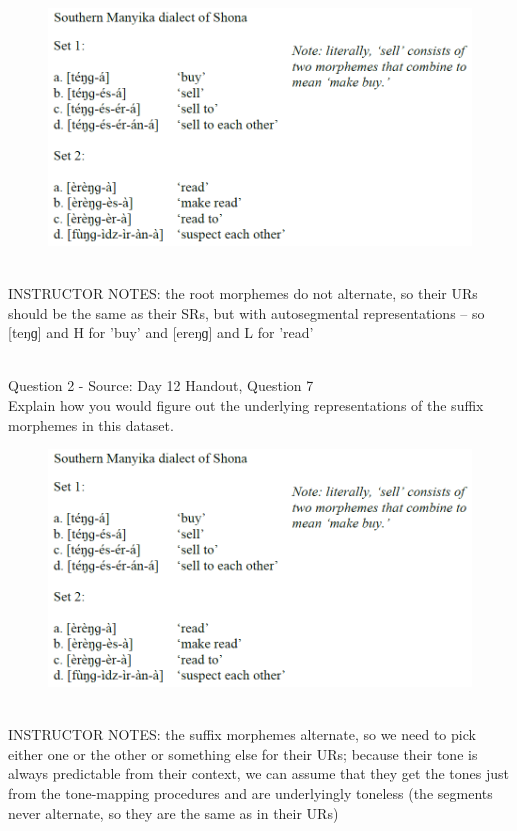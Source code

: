 \documentclass[12pt]{article}
\begin{document}
\begin{figure}[H]
\includegraphics{../images/shona.png}
\end{figure}

~\\
INSTRUCTOR NOTES: the root morphemes do not alternate, so their URs should be the same as their SRs, but with autosegmental representations -- so [teŋɡ] and H for 'buy' and [ereŋɡ] and L for 'read' 


~\\

{\large Question 2} - Source: Day 12 Handout, Question 7\\

Explain how you would figure out the underlying representations of the suffix morphemes in this dataset.\\

\begin{figure}[H]
\includegraphics{../images/shona.png}
\end{figure}

~\\
INSTRUCTOR NOTES: the suffix morphemes alternate, so we need to pick either one or the other or something else for their URs; because their tone is always predictable from their context, we can assume that they get the tones just from the tone-mapping procedures and are underlyingly toneless (the segments never alternate, so they are the same as in their URs)
\end{document}

